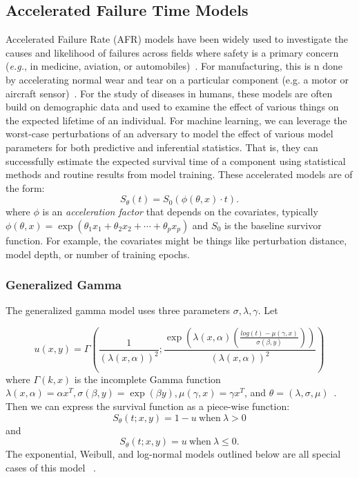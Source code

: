 \subsection{Accelerated Failure Time Models}

Accelerated Failure Rate (AFR) models have been widely used to investigate the causes and likelihood of failures across fields where safety is a primary concern (\textit{e.g.}, in medicine, aviation, or automobiles)~\citep{liu2013development,lawless1995methods}. For manufacturing, this is n done by accelerating normal wear and tear on a particular component (e.g. a motor or aircraft sensor)~\citep{liu2013development}. For the study of diseases in humans, these models are often build on demographic data and used to examine the effect of various things on the expected lifetime of an individual. For machine learning, we can leverage the worst-case perturbations of an adversary to model the effect of various model parameters for both predictive and inferential statistics. That is, they can successfully estimate the expected survival time of a component using statistical methods and routine results from model training. These accelerated models are of the form:
$$
	S_\theta(t) = S_0(\phi(\theta, x) \cdot t).
$$
where $\phi$ is an \textit{acceleration factor} that depends on the covariates, typically $\phi(\theta, x) = \exp{(\theta_1 x_1 + \theta_2 x_2 + \cdots + \theta_p x_p)}$ and $S_0$ is the baseline survivor function. For example, the covariates might be things like perturbation distance, model depth, or number of training epochs.

\subsubsection{Generalized Gamma}
The generalized gamma model uses three parameters $\sigma, \lambda,\gamma$. Let

$$
u (x,y)= \Gamma \left ( \frac{1}{(\lambda(x, \alpha))^2}; \frac{\exp \left( \lambda(x, \alpha) \left( \frac{log(t) - \mu(\gamma, x)}{\sigma(\beta, y)} \right ) \right) }{(\lambda(x, \alpha))^2} \right )
$$
where $\Gamma(k, x)$ is the incomplete Gamma function$ \lambda(x, \alpha) = \alpha x^T, \sigma(\beta, y) = \exp(\beta y ),   \mu(\gamma, x) = \gamma x^T$, and $\theta = (\lambda, \sigma, \mu) $~\cite{aft_models}. Then we can express the survival function as a piece-wise function:
$$
S_{\theta}(t; x, y) =  1 - u~\text{when}~\lambda > 0 
$$
and
$$
S_{\theta}(t; x, y) =  u~\text{when}~\lambda \leq 0 .
$$ 
The exponential, Weibull, and log-normal models outlined below are all special cases of this model ~\cite{kleinbaum1996survival}.

